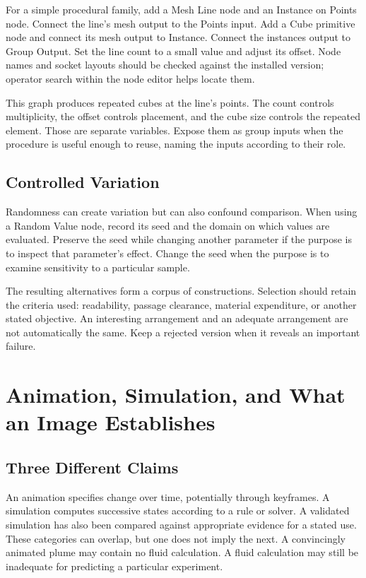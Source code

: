 \documentclass[11pt,openany]{book}
\begin{document}
For a simple procedural family, add a Mesh Line node and an Instance on Points node. Connect the line's mesh output to the Points input. Add a Cube primitive node and connect its mesh output to Instance. Connect the instances output to Group Output. Set the line count to a small value and adjust its offset. Node names and socket layouts should be checked against the installed version; operator search within the node editor helps locate them.

This graph produces repeated cubes at the line's points. The count controls multiplicity, the offset controls placement, and the cube size controls the repeated element. Those are separate variables. Expose them as group inputs when the procedure is useful enough to reuse, naming the inputs according to their role.

\section{Controlled Variation}

Randomness can create variation but can also confound comparison. When using a Random Value node, record its seed and the domain on which values are evaluated. Preserve the seed while changing another parameter if the purpose is to inspect that parameter's effect. Change the seed when the purpose is to examine sensitivity to a particular sample.

The resulting alternatives form a corpus of constructions. Selection should retain the criteria used: readability, passage clearance, material expenditure, or another stated objective. An interesting arrangement and an adequate arrangement are not automatically the same. Keep a rejected version when it reveals an important failure.



\chapter{Animation, Simulation, and What an Image Establishes}

\section{Three Different Claims}

An animation specifies change over time, potentially through keyframes. A simulation computes successive states according to a rule or solver. A validated simulation has also been compared against appropriate evidence for a stated use. These categories can overlap, but one does not imply the next. A convincingly animated plume may contain no fluid calculation. A fluid calculation may still be inadequate for predicting a particular experiment.
\end{document}
